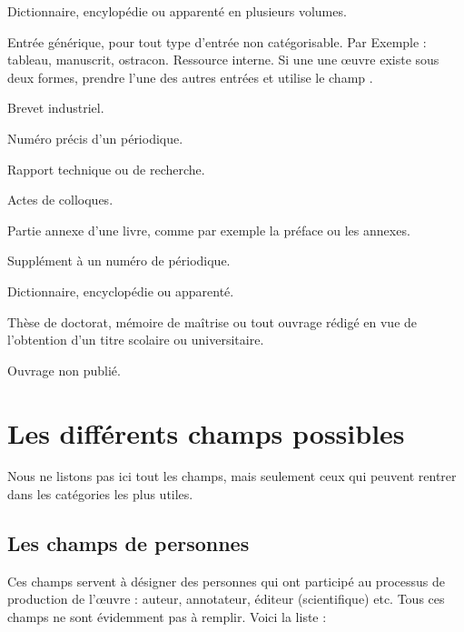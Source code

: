 \begin{fieldlist}
	 
	 Dictionnaire, encylopédie ou apparenté en plusieurs volumes.


	 Entrée générique, pour tout type d'entrée non catégorisable. Par Exemple : tableau, manuscrit, ostracon. 
	Ressource interne. Si une une œuvre existe sous deux formes, prendre l'une des autres entrées et utilise le champ .
	
	Brevet industriel.

	
	Numéro précis d'un périodique.
	
	
	Rapport technique ou de recherche.
		
	Actes de colloques.
	
	
		
	
	Partie annexe d'une livre, comme par exemple la préface ou les annexes.
	
	Supplément à un numéro de périodique.
	
	
	Dictionnaire, encyclopédie ou apparenté.

	
	Thèse de doctorat, mémoire de maîtrise ou tout ouvrage rédigé en vue de l'obtention d'un titre scolaire ou universitaire.
	
	
	Ouvrage non publié.
	
\end{fieldlist}


\section{Les différents champs possibles}

Nous ne listons pas ici tout les champs, mais seulement ceux qui peuvent rentrer dans les catégories les plus utiles.
\subsection{Les champs de personnes}

Ces champs servent à désigner des personnes qui ont participé au processus de production de l'œuvre : auteur, annotateur, éditeur (scientifique) etc. Tous ces champs ne sont évidemment pas à remplir. Voici la liste  :


